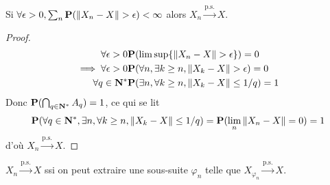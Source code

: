 	\begin{pop}
		Si $\forall \epsilon > 0, \sum_n \mathbf{P}(\left\lVert X_n - X\right\rVert > \epsilon) < \infty$ alors $X_n \overset{\text{p.s.}}{\longrightarrow} X$.
	\end{pop}
	
	\begin{proof}
		\begin{align}
			\forall \epsilon > 0 & \mathbf{P}(\limsup \{ \left\lVert X_n - X\right\rVert > \epsilon \}) = 0 \\
			\implies \forall \epsilon > 0 & \mathbf{P}(\forall n, \exists k \geq n, \left\lVert X_k - X\right\rVert > \epsilon) = 0 \\
			\forall q \in \mathbf{N}^* & \mathbf{P}(\exists n, \forall k \geq n, \left\lVert X_k - X\right\rVert \leq 1/q) = 1
		\end{align}
		Donc $\mathbf{P}(\bigcap_{q \in \mathbf{N}^*} A_q) = 1$, ce qui se lit
		$$\mathbf{P}(\forall q \in \mathbf{N}^*, \exists n, \forall k \geq n, \left\lVert X_k - X\right\rVert \leq 1/q) = \mathbf{P}(\lim_n \left\lVert X_n - X\right\rVert = 0) = 1$$
		d'où $X_n \overset{\text{p.s.}}{\longrightarrow} X$.
	\end{proof}

	\begin{pop}
		$X_n \overset{\text{p.s.}}{\longrightarrow} X$ ssi on peut extraire une sous-suite $\varphi_n$ telle que $X_{\varphi_n} \overset{\text{p.s.}}{\longrightarrow} X$.
	\end{pop}
